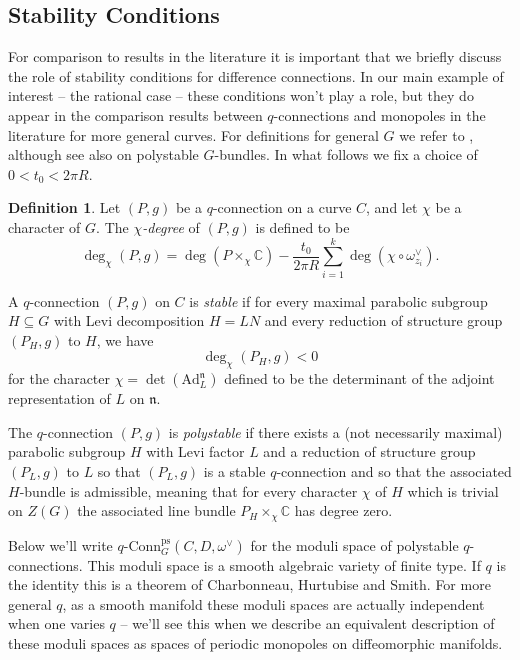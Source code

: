 \documentclass[11pt, oneside, reqno]{amsart}
\theoremstyle{definition} \newtheorem{definition}{Definition}[section]
\theoremstyle{definition} \newtheorem{remark}[definition]{Remark}
\theoremstyle{definition} \newtheorem{remarks}[definition]{Remarks}
\theoremstyle{definition} \newtheorem{question}[definition]{Question}
\theoremstyle{definition} \newtheorem*{note}{Note}
\theoremstyle{definition} \newtheorem{example}[definition]{Example}
\theoremstyle{definition} \newtheorem{examples}[definition]{Examples}
\newcommand{\mr}[1]{\mathrm{#1}}
\newcommand{\mf}[1]{\mathfrak{#1}}
\newcommand{\CC}{\mathbb{C}}
\newcommand{\sub}{\subseteq}
\newcommand{\qconn}{q\text{-Conn}}
\begin{document}
\subsection{Stability Conditions}
For comparison to results in the literature it is important that we briefly discuss the role of stability conditions for difference connections.  In our main example of interest -- the rational case -- these conditions won't play a role, but they do appear in the comparison results between $q$-connections and monopoles in the literature for more general curves.  For definitions for general $G$ we refer to \cite{Smith}, although see also \cite{AnchoucheBiswas} on polystable $G$-bundles.  In what follows we fix a choice of $0 < t_0 < 2\pi R$.

\begin{definition}
Let $(P,g)$ be a $q$-connection on a curve $C$, and let $\chi$ be a character of $G$.  The \emph{$\chi$-degree} of $(P,g)$ is defined to be 
\[\deg_\chi(P,g) = \deg(P \times_\chi \CC) - \frac {t_0}{2\pi R} \sum_{i=1}^k \deg(\chi \circ \omega^\vee_{z_i}).\]

A $q$-connection $(P,g)$ on $C$ is \emph{stable} if for every maximal parabolic subgroup $H \sub G$ with Levi decomposition $H = LN$ and every reduction of structure group $(P_H, g)$ to $H$, we have
\[\deg_\chi(P_H, g) < 0\]
for the character $\chi = \det(\mr{Ad}_L^{\mf n})$ defined to be the determinant of the adjoint representation of $L$ on $\mf n$.

The $q$-connection $(P,g)$ is \emph{polystable} if there exists a (not necessarily maximal) parabolic subgroup $H$ with Levi factor $L$ and a reduction of structure group $(P_L, g)$ to $L$ so that $(P_L,g)$ is a stable $q$-connection and so that the associated $H$-bundle is admissible, meaning that for every character $\chi$ of $H$ which is trivial on $Z(G)$ the associated line bundle $P_H \times_\chi \CC$ has degree zero. 
\end{definition}

Below we'll write $\qconn_G^{\text{ps}}(C, D, \omega^\vee)$ for the moduli space of polystable $q$-connections.  This moduli space is a smooth algebraic variety of finite type.  If $q$ is the identity this is a theorem of Charbonneau, Hurtubise and Smith.  For more general $q$, as a smooth manifold these moduli spaces are actually independent when one varies $q$ -- we'll see this when we describe an equivalent description of these moduli spaces as spaces of periodic monopoles on diffeomorphic manifolds.  
\end{document}
